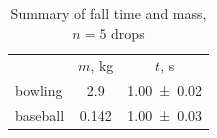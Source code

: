 \begin{table}
  \caption{Summary of fall time and mass, $n=5$ drops}
  \label{tab:5}
  \begin{ruledtabular}
    \begin{tabular}{lcc}
      & $m$, \unit{\kilo\gram} & $t$, \unit{\second} \\
      \colrule
      bowling  & \num{2.9}   & \num{1.00\pm0.02} \\
      baseball & \num{0.142} & \num{1.00\pm0.03} 
    \end{tabular}
  \end{ruledtabular}
\end{table}

